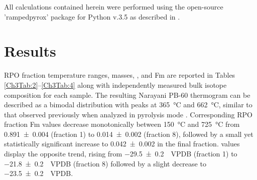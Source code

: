 All calculations contained herein were performed using the open-source 'rampedpyrox' package for Python v.3.5 as described in \citet{Hemingway:bA3-kvLz}.

\section{Results}

RPO fraction temperature ranges,  masses, , and Fm are reported in Tables \ref{Ch3Tab:2}--\ref{Ch3Tab:4} along with independently measured bulk isotope composition for each sample. The resulting Narayani PB-60 thermogram can be described as a bimodal distribution with peaks at \SI{365}{\celsius} and \SI{662}{\celsius}, similar to that observed previously when analyzed in pyrolysis mode \citep[Figure \ref{Ch3Fig:2}A;][]{Rosenheim:2012kh}. Corresponding RPO fraction Fm values decrease monotonically between \SI{150}{\celsius} and \SI{725}{\celsius} from \num{0.891 \pm 0.004} (fraction 1) to \num{0.014 \pm 0.002} (fraction 8), followed by a small yet statistically significant increase to \num{0.042 \pm 0.002} in the final fraction.  values display the opposite trend, rising from \SI{-29.5 \pm 0.2}{\permil.VPDB} (fraction 1) to \SI{-21.8 \pm 0.2}{\permil.VPDB} (fraction 8) followed by a slight decrease to \SI{-23.5 \pm 0.2}{\permil.VPDB}. 


